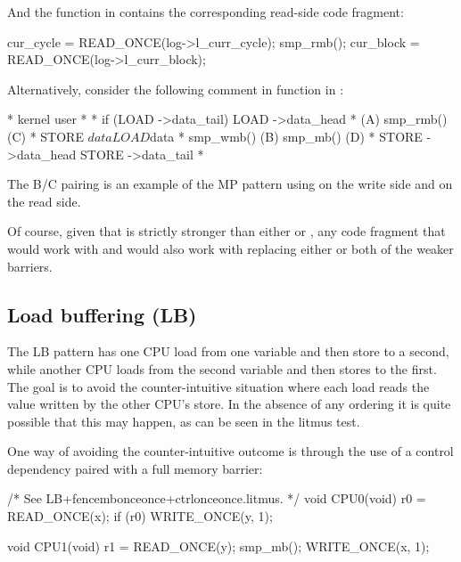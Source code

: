 And the  function in 
contains the corresponding read-side code fragment:

\begin{VerbatimU}
	cur_cycle = READ_ONCE(log->l_curr_cycle);
	smp_rmb();
	cur_block = READ_ONCE(log->l_curr_block);
\end{VerbatimU}

Alternatively, consider the following comment in function
 in :

\begin{VerbatimU}
	 *   kernel                             user
	 *
	 *   if (LOAD ->data_tail) {            LOAD ->data_head
	 *                      (A)             smp_rmb()       (C)
	 *      STORE $data                     LOAD $data
	 *      smp_wmb()       (B)             smp_mb()        (D)
	 *      STORE ->data_head               STORE ->data_tail
	 *   }
\end{VerbatimU}

The B/C pairing is an example of the MP pattern using  on the
write side and  on the read side.

Of course, given that  is strictly stronger than either
 or , any code fragment that would work with
 and  would also work with 
replacing either or both of the weaker barriers.


\subsection{Load buffering (LB)}

The LB pattern has one CPU load from one variable and then store to a
second, while another CPU loads from the second variable and then stores
to the first.
The goal is to avoid the counter-intuitive situation where each load
reads the value written by the other CPU's store.
In the absence of any ordering it is quite possible that this may happen,
as can be seen in the  litmus test.

One way of avoiding the counter-intuitive outcome is through the use of a
control dependency paired with a full memory barrier:

\begin{VerbatimU}
	/* See LB+fencembonceonce+ctrlonceonce.litmus. */
	void CPU0(void)
	{
		r0 = READ_ONCE(x);
		if (r0)
			WRITE_ONCE(y, 1);
	}

	void CPU1(void)
	{
		r1 = READ_ONCE(y);
		smp_mb();
		WRITE_ONCE(x, 1);
	}
\end{VerbatimU}

